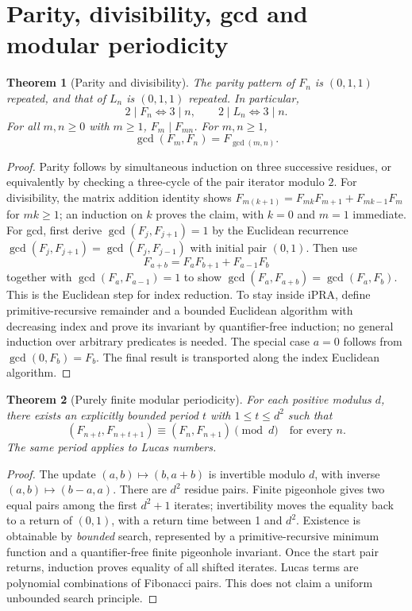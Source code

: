 \documentclass[11pt]{article}
\newtheorem{theorem}{Theorem}[section]
\begin{document}
\section{Parity, divisibility, gcd and modular periodicity}
\begin{theorem}[Parity and divisibility]
The parity pattern of $F_n$ is $(0,1,1)$ repeated, and that of $L_n$ is $(0,1,1)$ repeated. In particular,
\[2\mid F_n\iff3\mid n,\qquad 2\mid L_n\iff3\mid n.\tag{17}\]
For all $m,n\ge0$ with $m\ge1$, $F_m\mid F_{mn}$. For $m,n\ge1$,
\[\gcd(F_m,F_n)=F_{\gcd(m,n)}.\tag{18}\]
\end{theorem}
\begin{proof}
Parity follows by simultaneous induction on three successive residues, or equivalently by checking a three-cycle of the pair iterator modulo $2$. For divisibility, the matrix addition identity shows $F_{m(k+1)}=F_{mk}F_{m+1}+F_{mk-1}F_m$ for $mk\ge1$; an induction on $k$ proves the claim, with $k=0$ and $m=1$ immediate. For gcd, first derive $\gcd(F_j,F_{j+1})=1$ by the Euclidean recurrence $\gcd(F_j,F_{j+1})=\gcd(F_j,F_{j-1})$ with initial pair $(0,1)$. Then use
\[F_{a+b}=F_aF_{b+1}+F_{a-1}F_b\]
together with $\gcd(F_a,F_{a-1})=1$ to show $\gcd(F_a,F_{a+b})=\gcd(F_a,F_b)$. This is the Euclidean step for index reduction. To stay inside iPRA, define primitive-recursive remainder and a bounded Euclidean algorithm with decreasing index and prove its invariant by quantifier-free induction; no general induction over arbitrary predicates is needed. The special case $a=0$ follows from $\gcd(0,F_b)=F_b$. The final result is transported along the index Euclidean algorithm.
\end{proof}
\begin{theorem}[Purely finite modular periodicity]
For each positive modulus $d$, there exists an explicitly bounded period $t$ with $1\le t\le d^2$ such that
\[(F_{n+t},F_{n+t+1})\equiv(F_n,F_{n+1})\pmod d\quad\text{for every }n.\tag{19}\]
The same period applies to Lucas numbers. 
\end{theorem}
\begin{proof}
The update $(a,b)\mapsto(b,a+b)$ is invertible modulo $d$, with inverse $(a,b)\mapsto(b-a,a)$. There are $d^2$ residue pairs. Finite pigeonhole gives two equal pairs among the first $d^2+1$ iterates; invertibility moves the equality back to a return of $(0,1)$, with a return time between 1 and $d^2$. Existence is obtainable by \emph{bounded} search, represented by a primitive-recursive minimum function and a quantifier-free finite pigeonhole invariant. Once the start pair returns, induction proves equality of all shifted iterates. Lucas terms are polynomial combinations of Fibonacci pairs. This does not claim a uniform unbounded search principle.
\end{proof}
\end{document}
